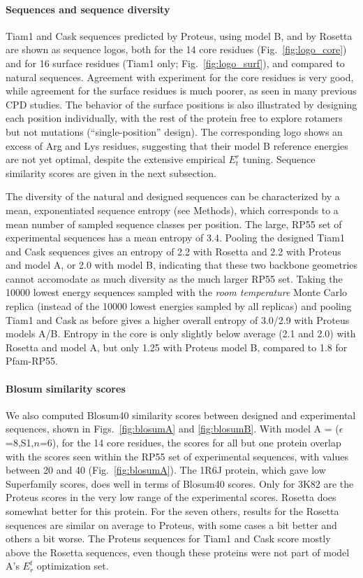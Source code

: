 \documentclass[12pt]{article}
\begin{document}
\paragraph{Sequences and sequence diversity}
Tiam1 and Cask sequences predicted by Proteus, using model B, and by Rosetta are shown as sequence logos, both for the 14 core
residues (Fig.\ \ref{fig:logo_core}) and for 16 surface residues (Tiam1 only; Fig.\ \ref{fig:logo_surf}), and compared to natural
sequences. Agreement with experiment for the core residues is very good, while agreement for the surface residues is much poorer,
as seen in many previous CPD studies. The behavior of the surface positions is also illustrated by designing each position
individually, with the rest of the protein free to explore rotamers but not mutations (``single-position'' design). The
corresponding logo shows an excess of Arg and Lys residues, suggesting that their model B reference energies are not yet optimal,
despite the extensive empirical $E^r_t$ tuning. Sequence similarity scores are given in the next subsection.

The diversity of the natural and designed sequences can be characterized by a mean, exponentiated sequence entropy (see Methods),
which corresponds to a mean number of sampled sequence classes per position. The large, RP55 set of experimental sequences has
a mean entropy of 3.4. Pooling the designed Tiam1 and Cask sequences gives an entropy of 2.2 with Rosetta and 2.2 with Proteus
and model A, or 2.0 with model B, indicating that these two backbone geometries cannot accomodate as much diversity as the much
larger RP55 set. Taking the 10000 lowest energy sequences sampled with the {\it room temperature} Monte Carlo replica (instead
of the 10000 lowest energies sampled by all replicas) and pooling Tiam1 and Cask as before gives a higher overall entropy of
3.0/2.9 with Proteus models A/B. Entropy in the core is only slightly below average (2.1 and 2.0) with Rosetta and model A, but
only 1.25 with Proteus model B, compared to 1.8 for Pfam-RP55. 

\paragraph{Blosum similarity scores}
We also computed Blosum40 similarity scores between designed and experimental sequences, shown in Figs.\ \ref{fig:blosumA}
and \ref{fig:blosumB}. With model A = ($\epsilon$=8,S1,$n$=6), for the 14 core residues, the scores for all but one protein
overlap with the scores seen within the RP55 set of experimental sequences, with values between 20 and 40 (Fig.\
\ref{fig:blosumA}). The 1R6J protein, which gave low Superfamily scores, does well in terms of Blosum40 scores. Only for 3K82
are the Proteus scores in the very low range of the experimental scores. Rosetta does somewhat better for this protein. For the
seven others, results for the Rosetta sequences are similar on average to Proteus, with some cases a bit better and others a
bit worse. The Proteus sequences for Tiam1 and Cask score mostly above the Rosetta sequences, even though these proteins were
not part of model A's $E_r^t$ optimization set. 
\end{document}
